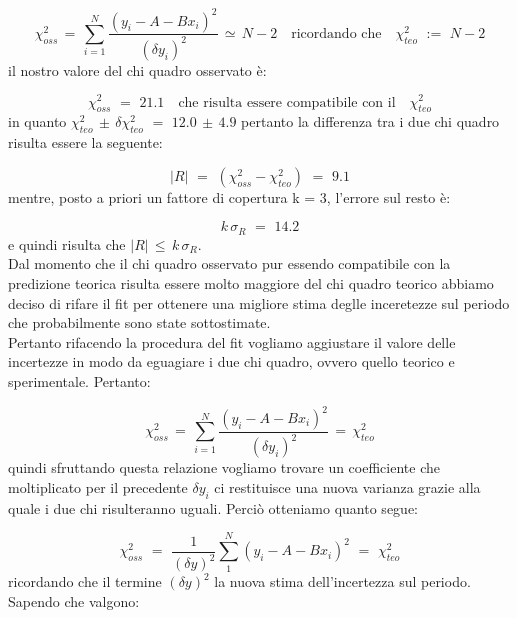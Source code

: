 \begin{equation*}
	\chi_{oss}^2 \,=\, \sum_{i=1}^{N} \frac{(y_i - A - Bx_i)^2}{(\delta y_i)^2} \,\simeq\, N - 2 \quad \text{ricordando che} \quad \chi_{teo}^2 \,\,:=\,\, N - 2
\end{equation*}
%
il nostro valore del chi quadro osservato è:

\begin{equation*}
	\chi_{oss}^2 \,\,=\,\, 21.1 \quad \text{che risulta essere compatibile con il} \quad \chi_{teo}^2
\end{equation*}
%
in quanto $\chi_{teo}^2 \, \pm \, \delta \chi_{teo}^2 \,\,=\,\, 12.0 \, \pm \, 4.9$ pertanto la differenza tra i due chi quadro risulta essere la seguente:

\begin{equation*}
	|R| \,\,=\,\, (\chi_{oss}^2 - \chi_{teo}^2) \,\,=\,\, 9.1
\end{equation*}
%
mentre, posto a priori un fattore di copertura k = 3, l'errore sul resto è:

\begin{equation*}
	k \, \sigma_{R} \,\,=\,\, 14.2
\end{equation*}
%
e quindi risulta che $|R| \, \leq \, k \, \sigma_{R}$.\\

Dal momento che il chi quadro osservato pur essendo compatibile con la predizione teorica risulta essere molto maggiore del chi quadro teorico abbiamo deciso di rifare il fit per ottenere una migliore stima deglle inceretezze sul periodo che probabilmente sono state sottostimate.\\
Pertanto rifacendo la procedura del fit vogliamo aggiustare il valore delle incertezze in modo da eguagiare i due chi quadro, ovvero quello teorico e sperimentale. Pertanto:

\begin{equation*}
	\chi_{oss}^2 \,=\, \sum_{i=1}^{N} \frac{(y_i - A - Bx_i)^2}{(\delta y_i)^2} \,=\, \chi_{teo}^2 
\end{equation*}
%
quindi sfruttando questa relazione vogliamo trovare un coefficiente che moltiplicato per il precedente $\delta y_i$ ci restituisce una nuova varianza grazie alla quale i due chi risulteranno uguali. Perciò otteniamo quanto segue:
	
\begin{equation*}
	\chi_{oss}^2 \,\,=\,\, \frac{1}{(\delta y)^2} \sum_{1}^{N} (y_i - A - Bx_i)^2  \,\,=\,\, \chi_{teo}^2
\end{equation*}
%
ricordando che il termine $(\delta y)^2$ la nuova stima dell'incertezza sul periodo. Sapendo che valgono:
	
